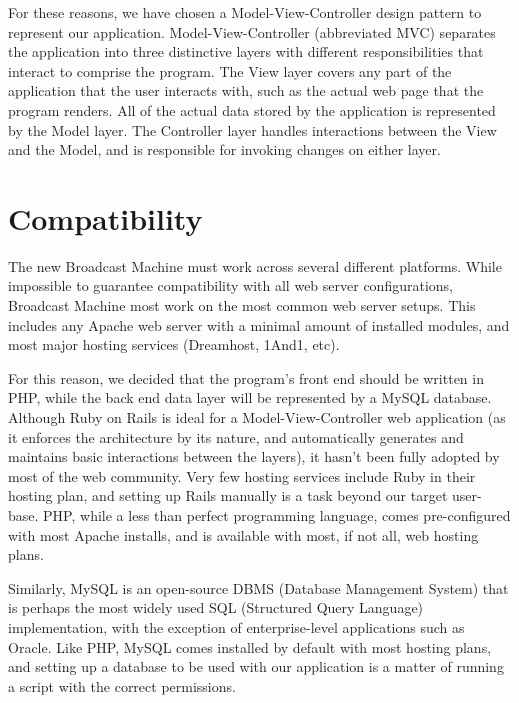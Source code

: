 \documentclass[a4paper,12pt]{report}
\begin{document}
For these reasons, we have chosen a Model-View-Controller design pattern to represent our application. Model-View-Controller (abbreviated MVC) separates the application into three distinctive layers with different responsibilities that interact to comprise the program. The View layer covers any part of the application that the user interacts with, such as the actual web page that the program renders. All of the actual data stored by the application is represented by the Model layer. The Controller layer handles interactions between the View and the Model, and is responsible for invoking changes on either layer.

\section{Compatibility}

The new Broadcast Machine must work across several different platforms. While impossible to guarantee compatibility with all web server configurations, Broadcast Machine most work on the most common web server setups. This includes any Apache web server with a minimal amount of installed modules, and most major hosting services (Dreamhost, 1And1, etc). 

For this reason, we decided that the program’s front end should be written in PHP, while the back end data layer will be represented by a MySQL database. Although Ruby on Rails is ideal for a Model-View-Controller web application (as it enforces the architecture by its nature, and automatically generates and maintains basic interactions between the layers), it hasn’t been fully adopted by most of the web community. Very few hosting services include Ruby in their hosting plan, and setting up Rails manually is a task beyond our target user-base. PHP, while a less than perfect programming language, comes pre-configured with most Apache installs, and is available with most, if not all, web hosting plans. 

Similarly, MySQL is an open-source DBMS (Database Management System) that is perhaps the most widely used SQL (Structured Query Language) implementation, with the exception of enterprise-level applications such as Oracle. Like PHP, MySQL comes installed by default with most hosting plans, and setting up a database to be used with our application is a matter of running a script with the correct permissions. 
\end{document}
